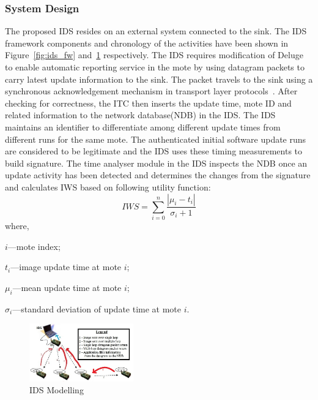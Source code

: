 \documentclass[conference]{IEEEtran}
\begin{document}
\subsubsection*{System Design}
The proposed IDS resides on an external system connected to the sink.
The IDS framework components and chronology of the activities have been shown in Figure~\ref{fig:ids_fw} and~\ref{fig:ids_model} respectively.
The IDS requires modification of Deluge to enable automatic reporting service in the mote by using datagram packets to carry latest update information to the sink.
The packet travels to the sink using a synchronous acknowledgement mechanism in transport layer protocols~\cite{tep116}.
After checking for correctness, the ITC then inserts the update time, mote ID and related information to the network database(NDB) in the IDS.
The IDS maintains an identifier to differentiate among different update times from different runs for the same mote.
The authenticated initial software update runs are considered to be legitimate and the IDS uses these timing measurements to build signature.
The time analyser module in the IDS inspects the NDB once an update activity has been detected and determines the changes from the signature and calculates IWS based on following utility function:
\begin{equation}
\label{eqn2} 
	\mathit{IWS} = \sum \limits_{i=0}^{n} \frac{\left| \mu_i - t_i \right|}{\sigma_i + 1}
\end{equation}
where, 
\begin{inparaenum}
\item $\mathit{i}$---mote index;%
\item $\mathit{t_i}$---image update time at mote $\mathit{i}$;  
\item $\mathit{\mu_i}$---mean update time at mote $\mathit{i}$;  
\item $\mathit{\sigma_i}$---standard deviation of update time at mote $\mathit{i}$. 
\end{inparaenum}	
\begin{figure}[btp]
    \centering
    \includegraphics[width=0.4\textwidth]{IDS}
    \caption{IDS Modelling}
    \label{fig:ids_model}
\end{figure}
\end{document}
